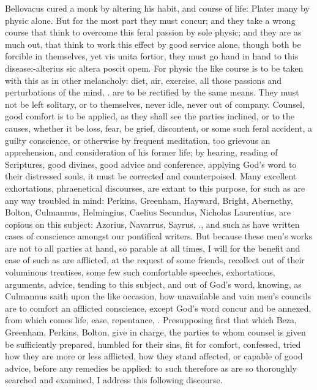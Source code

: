 {Bellovacus cured a monk by altering his habit, and course of
life: Plater many by physic alone. But for the most part they must
concur; and they take a wrong course that think to overcome this feral
passion by sole physic; and they are as much out, that think to work
this effect by good service alone, though both be forcible in
themselves, yet vis unita fortior, they must go hand in hand to this
disease:-alterius sic altera poscit opem. For physic the like course is
to be taken with this as in other melancholy: diet, air, exercise, all
those passions and perturbations of the mind, \etc{}. are to be rectified
by the same means. They must not be left solitary, or to themselves,
never idle, never out of company. Counsel, good comfort is to be
applied, as they shall see the parties inclined, or to the causes,
whether it be loss, fear, be grief, discontent, or some such feral
accident, a guilty conscience, or otherwise by frequent meditation, too
grievous an apprehension, and consideration of his former life; by
hearing, reading of Scriptures, good divines, good advice and
conference, applying God's word to their distressed souls, it must be
corrected and counterpoised. Many excellent exhortations, phraenetical
discourses, are extant to this purpose, for such as are any way
troubled in mind: Perkins, Greenham, Hayward, Bright, Abernethy,
Bolton, Culmannus, Helmingius, Caelius Secundus, Nicholas Laurentius,
are copious on this subject: Azorius, Navarrus, Sayrus, \etc{}., and such
as have written cases of conscience amongst our pontifical writers. But
because these men's works are not to all parties at hand, so parable at
all times, I will for the benefit and ease of such as are afflicted, at
the request of some friends, recollect out of their voluminous
treatises, some few such comfortable speeches, exhortations, arguments,
advice, tending to this subject, and out of God's word, knowing, as
Culmannus saith upon the like occasion, how unavailable and vain
men's councils are to comfort an afflicted conscience, except God's
word concur and be annexed, from which comes life, ease, repentance,
\etc{}. Presupposing first that which Beza, Greenham, Perkins, Bolton, give
in charge, the parties to whom counsel is given be sufficiently
prepared, humbled for their sins, fit for comfort, confessed, tried how
they are more or less afflicted, how they stand affected, or capable of
good advice, before any remedies be applied: to such therefore as are
so thoroughly searched and examined, I address this following
discourse.

}
